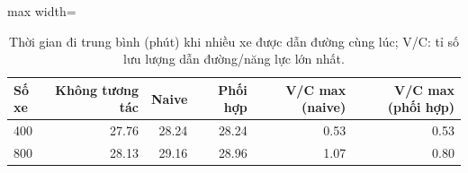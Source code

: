 \begin{table}[!htbp]
\centering
\small
\caption{Thời gian đi trung bình (phút) khi nhiều xe được dẫn đường cùng lúc; V/C: tỉ số lưu lượng dẫn đường/năng lực lớn nhất.}
\label{tab:tab_multiagent}
\begin{adjustbox}{max width=\linewidth}
\begin{tabular}{lrrrrr}
\toprule
Số xe & Không tương tác & Naive & Phối hợp & V/C max (naive) & V/C max (phối hợp) \\
\midrule
400 & 27.76 & 28.24 & 28.24 & 0.53 & 0.53 \\
800 & 28.13 & 29.16 & 28.96 & 1.07 & 0.80 \\
\bottomrule
\end{tabular}
\end{adjustbox}
\end{table}

